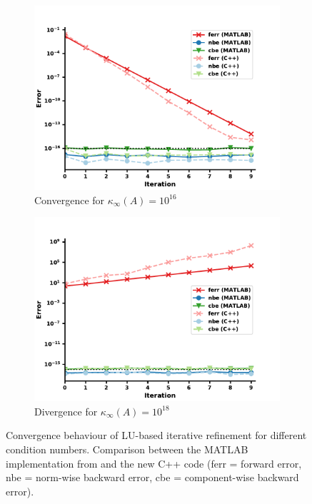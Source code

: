 \begin{figure}
\centering
\begin{subfigure}{.5\textwidth}
  \centering
  \includegraphics[width=\linewidth]{chapters/5_experiments/figures/LUe16.pdf}
  \caption{Convergence for $\kappa_\infty(A) = 10^{16}$}
  \label{fig:lue16}
\end{subfigure}%
\begin{subfigure}{.5\textwidth}
  \centering
  \includegraphics[width=\linewidth]{chapters/5_experiments/figures/LUe18.pdf}
  \caption{Divergence for $\kappa_\infty(A) = 10^{18}$}
  \label{fig:lue18}
\end{subfigure}
\caption[LU-based IR]{Convergence behaviour of LU-based iterative refinement for different condition numbers. Comparison between the MATLAB implementation from \cite{carson_new_2017} and the new C++ code (ferr = forward error, nbe = norm-wise backward error, cbe = component-wise backward error).}
\label{fig:lue_ir}
\end{figure}

